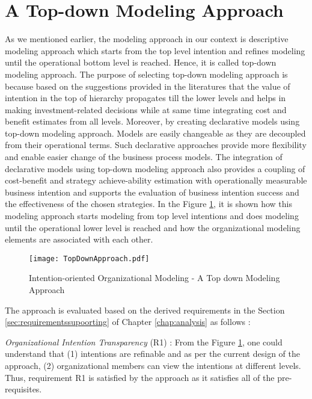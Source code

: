 \section{A Top-down Modeling Approach}
\label{sec:topdownapproach}
As we mentioned earlier, the modeling approach in our context is descriptive modeling approach which starts from the top level intention and refines modeling until the operational bottom level is reached. Hence, it is called top-down modeling approach. The purpose of selecting top-down modeling approach is because based on the suggestions provided in the literatures \cite{Mandic2010, Bider2005,Sungur2016} that the value of intention in the top of hierarchy propagates till the lower levels and helps in making investment-related decisions while at same time integrating cost and benefit estimates from all levels. Moreover, by creating declarative models using top-down modeling approach. Models are easily changeable as they are decoupled from their operational terms. Such declarative approaches provide more flexibility and enable easier change of the business process models. The integration of declarative models using top-down modeling approach also provides a coupling of cost-benefit and strategy achieve-ability estimation with operationally measurable business intention and supports the evaluation of business intention success and the effectiveness of the chosen strategies. In the Figure \ref{fig:topdownapproach}, it is shown how this modeling approach starts modeling from top level intentions and does modeling until the operational lower level is reached and how the organizational modeling elements are associated with each other. 

\begin{figure}
	\centering
	\texttt{[image: TopDownApproach.pdf]}
	\caption{Intention-oriented Organizational Modeling - A Top down Modeling Approach}
	\label{fig:topdownapproach}
\end{figure}

The approach is evaluated based on the derived requirements in the Section \ref{sec:requirementssupoorting} of Chapter \ref{chap:analysis} as follows :

\textit{Organizational Intention Transparency} (R1) : From the Figure \ref{fig:topdownapproach}, one could understand that (1) intentions are refinable and as per the current design of the approach, (2) organizational members can view the intentions at different levels. Thus, requirement R1 is satisfied by the approach as it satisfies all of the pre-requisites. 

